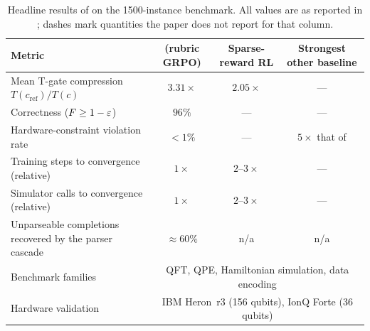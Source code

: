 \begin{table}[htbp]
\caption{Headline results of \rubriq{} on the \num{1500}-instance benchmark. All values are as reported in \cite{guo2026rubriq}; dashes mark quantities the paper does not report for that column.}
\label{tab:syn:results}
\centering\footnotesize
\begin{tabularx}{\textwidth}{@{}X c c c@{}}
\toprule
Metric & \rubriq{} (rubric GRPO) & Sparse-reward RL & Strongest other baseline \\
\midrule
Mean T-gate compression $T(c_{\mathrm{ref}})/T(c)$ & $3.31\times$ & $2.05\times$ & --- \\
Correctness ($F\ge 1-\varepsilon$) & $96\%$ & --- & --- \\
Hardware-constraint violation rate & $<1\%$ & --- & $5\times$ that of \rubriq{} \\
Training steps to convergence (relative) & $1\times$ & $2$--$3\times$ & --- \\
Simulator calls to convergence (relative) & $1\times$ & $2$--$3\times$ & --- \\
Unparseable completions recovered by the parser cascade & $\approx 60\%$ & n/a & n/a \\
Benchmark families & \multicolumn{3}{c}{QFT, QPE, Hamiltonian simulation, data encoding} \\
Hardware validation & \multicolumn{3}{c}{IBM Heron~r3 (156 qubits), IonQ Forte (36 qubits)} \\
\bottomrule
\end{tabularx}
\end{table}

